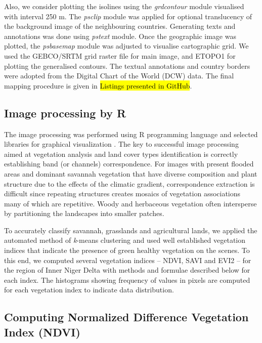 \documentclass[12pt,a4paper,oneside]{article}
\def \newpar{\vspace{6pt}}
\begin{document}
\newpar Also, we consider plotting the isolines using the \emph{grdcontour} module visualised with interval 250 m. The \emph{psclip} module was applied for optional translucency of the background image of the neighbouring countries. Generating texts and annotations was done using \emph{pstext} module. Once the geographic image was plotted, the \emph{psbasemap} module was adjusted to visualise cartographic grid. We used the GEBCO/SRTM grid raster file for main image, and ETOPO1 for plotting the generalised contours. The textual annotations and country borders were adopted from the Digital Chart of the World (DCW) data. The final mapping procedure is given in \hl{Listings presented in GitHub}.

\subsection*{Image processing by R}

\newpar The image processing was performed using R programming language \citep{RCoreTeam} and selected libraries for graphical visualization \citep{Murrell}. The key to successful image processing aimed at vegetation analysis and land cover types identification is correctly establishing band (or channels) correspondence. For images with present flooded areas and dominant savannah vegetation that have diverse composition and plant structure due to the effects of the climatic gradient, correspondence extraction is difficult since repeating structures creates mosaics of vegetation associations many of which are repetitive. Woody and herbaceous vegetation often intersperse by partitioning the landscapes into smaller patches. 

\newpar To accurately classify savannah, grasslands and agricultural lands, we applied the automated method of \emph{k}-means clustering and used well established vegetation indices that indicate the presence of green healthy vegetation on the scenes. To this end, we computed several vegetation indices -- NDVI, SAVI and EVI2 -- for the region of Inner Niger Delta with methods and formulae described below for each index. The histograms showing frequency of values in pixels are computed for each vegetation index to indicate data distribution.

\subsection*{Computing Normalized Difference Vegetation Index (NDVI)}
\end{document}
